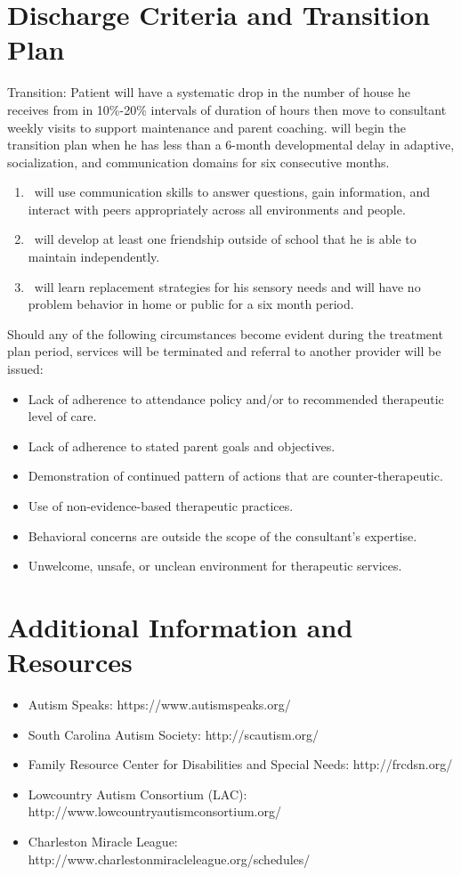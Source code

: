 \documentclass{article}
\def\clientfirstname{}
\begin{document}
\section{Discharge Criteria and Transition Plan}
Transition:  Patient will have a systematic drop in the number of house he receives from in 10\%-20\% intervals of duration of hours then move to consultant weekly visits to support maintenance and parent coaching. \clientfirstname will begin the transition plan when he has less than a 6-month developmental delay in adaptive, socialization, and communication domains for six consecutive months.  

	\begin{enumerate}
	\item \clientfirstname\ will use communication skills to answer questions, gain information, and interact with peers appropriately across all environments and people.
	\item \clientfirstname\ will develop at least one friendship outside of school that he is able to maintain independently.
	\item \clientfirstname\ will learn replacement strategies for his sensory needs and will have no problem behavior in home or public for a six month period.
	\end{enumerate}

Should any of the following circumstances become evident during the treatment plan period, services will be terminated and referral to another provider will be issued: 
	\begin{itemize}
	\item Lack of adherence to attendance policy and/or to recommended therapeutic level of care. 
	\item Lack of adherence to stated parent goals and objectives. 
	\item Demonstration of continued pattern of actions that are counter-therapeutic.
	\item Use of non-evidence-based therapeutic practices. 
	\item Behavioral concerns are outside the scope of the consultant’s expertise. 
	\item Unwelcome, unsafe, or unclean environment for therapeutic services. 
	\end{itemize}

\section{Additional Information and Resources}
	\begin{itemize}
	\item Autism Speaks: https://www.autismspeaks.org/ 
	\item South Carolina Autism Society: http://scautism.org/
	\item Family Resource Center for Disabilities and Special Needs: http://frcdsn.org/
	\item Lowcountry Autism Consortium (LAC): http://www.lowcountryautismconsortium.org/
	\item Charleston Miracle League: http://www.charlestonmiracleleague.org/schedules/ 
	\end{itemize}
\end{document}
